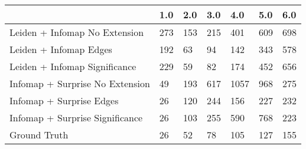 \begin{tabular}{lllllll}
\toprule
{} &  1.0 &  2.0 &  3.0 &   4.0 &  5.0 &  6.0 \\
\midrule
Leiden + Infomap No Extension   &  273 &  153 &  215 &   401 &  609 &  698 \\
Leiden + Infomap Edges          &  192 &   63 &   94 &   142 &  343 &  578 \\
Leiden + Infomap Significance   &  229 &   59 &   82 &   174 &  452 &  656 \\
Infomap + Surprise No Extension &   49 &  193 &  617 &  1057 &  968 &  275 \\
Infomap + Surprise Edges        &   26 &  120 &  244 &   156 &  227 &  232 \\
Infomap + Surprise Significance &   26 &  103 &  255 &   590 &  768 &  223 \\
Ground Truth                    &   26 &   52 &   78 &   105 &  127 &  155 \\
\bottomrule
\end{tabular}
